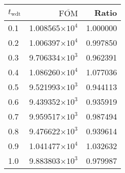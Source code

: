 \begin{tabular}{lrr}
\toprule
$t_{\mathrm{wdt}}$ & $\overline{\mathrm{FOM}}$ &    Ratio \\
\midrule
               0.1 &   1.008565$\times 10^{4}$ & 1.000000 \\
               0.2 &   1.006397$\times 10^{4}$ & 0.997850 \\
               0.3 &   9.706334$\times 10^{3}$ & 0.962391 \\
               0.4 &   1.086260$\times 10^{4}$ & 1.077036 \\
               0.5 &   9.521993$\times 10^{3}$ & 0.944113 \\
               0.6 &   9.439352$\times 10^{3}$ & 0.935919 \\
               0.7 &   9.959517$\times 10^{3}$ & 0.987494 \\
               0.8 &   9.476622$\times 10^{3}$ & 0.939614 \\
               0.9 &   1.041477$\times 10^{4}$ & 1.032632 \\
               1.0 &   9.883803$\times 10^{3}$ & 0.979987 \\
\bottomrule
\end{tabular}
